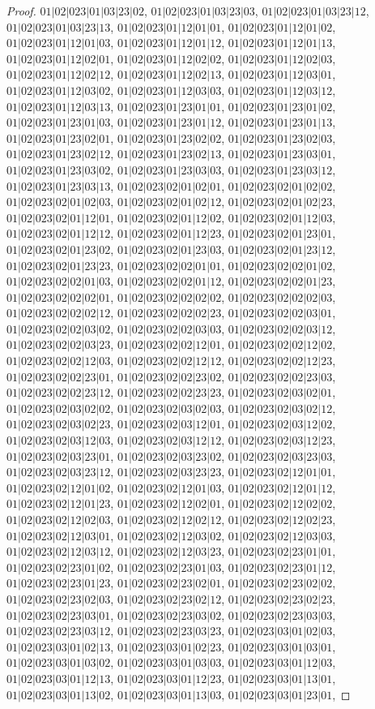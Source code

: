 \documentclass[12pt]{article}
\theoremstyle{plain}
\theoremstyle{definition}
\theoremstyle{remark}
\begin{document}
\begin{proof}
$01|02|023|01|03|23|02$, $01|02|023|01|03|23|03$, $01|02|023|01|03|23|12$, $01|02|023|01|03|23|13$, $01|02|023|01|12|01|01$, $01|02|023|01|12|01|02$, $01|02|023|01|12|01|03$, $01|02|023|01|12|01|12$, $01|02|023|01|12|01|13$, $01|02|023|01|12|02|01$, $01|02|023|01|12|02|02$, $01|02|023|01|12|02|03$, $01|02|023|01|12|02|12$, $01|02|023|01|12|02|13$, $01|02|023|01|12|03|01$, $01|02|023|01|12|03|02$, $01|02|023|01|12|03|03$, $01|02|023|01|12|03|12$, $01|02|023|01|12|03|13$, $01|02|023|01|23|01|01$, $01|02|023|01|23|01|02$, $01|02|023|01|23|01|03$, $01|02|023|01|23|01|12$, $01|02|023|01|23|01|13$, $01|02|023|01|23|02|01$, $01|02|023|01|23|02|02$, $01|02|023|01|23|02|03$, $01|02|023|01|23|02|12$, $01|02|023|01|23|02|13$, $01|02|023|01|23|03|01$, $01|02|023|01|23|03|02$, $01|02|023|01|23|03|03$, $01|02|023|01|23|03|12$, $01|02|023|01|23|03|13$, $01|02|023|02|01|02|01$, $01|02|023|02|01|02|02$, $01|02|023|02|01|02|03$, $01|02|023|02|01|02|12$, $01|02|023|02|01|02|23$, $01|02|023|02|01|12|01$, $01|02|023|02|01|12|02$, $01|02|023|02|01|12|03$, $01|02|023|02|01|12|12$, $01|02|023|02|01|12|23$, $01|02|023|02|01|23|01$, $01|02|023|02|01|23|02$, $01|02|023|02|01|23|03$, $01|02|023|02|01|23|12$, $01|02|023|02|01|23|23$, $01|02|023|02|02|01|01$, $01|02|023|02|02|01|02$, $01|02|023|02|02|01|03$, $01|02|023|02|02|01|12$, $01|02|023|02|02|01|23$, $01|02|023|02|02|02|01$, $01|02|023|02|02|02|02$, $01|02|023|02|02|02|03$, $01|02|023|02|02|02|12$, $01|02|023|02|02|02|23$, $01|02|023|02|02|03|01$, $01|02|023|02|02|03|02$, $01|02|023|02|02|03|03$, $01|02|023|02|02|03|12$, $01|02|023|02|02|03|23$, $01|02|023|02|02|12|01$, $01|02|023|02|02|12|02$, $01|02|023|02|02|12|03$, $01|02|023|02|02|12|12$, $01|02|023|02|02|12|23$, $01|02|023|02|02|23|01$, $01|02|023|02|02|23|02$, $01|02|023|02|02|23|03$, $01|02|023|02|02|23|12$, $01|02|023|02|02|23|23$, $01|02|023|02|03|02|01$, $01|02|023|02|03|02|02$, $01|02|023|02|03|02|03$, $01|02|023|02|03|02|12$, $01|02|023|02|03|02|23$, $01|02|023|02|03|12|01$, $01|02|023|02|03|12|02$, $01|02|023|02|03|12|03$, $01|02|023|02|03|12|12$, $01|02|023|02|03|12|23$, $01|02|023|02|03|23|01$, $01|02|023|02|03|23|02$, $01|02|023|02|03|23|03$, $01|02|023|02|03|23|12$, $01|02|023|02|03|23|23$, $01|02|023|02|12|01|01$, $01|02|023|02|12|01|02$, $01|02|023|02|12|01|03$, $01|02|023|02|12|01|12$, $01|02|023|02|12|01|23$, $01|02|023|02|12|02|01$, $01|02|023|02|12|02|02$, $01|02|023|02|12|02|03$, $01|02|023|02|12|02|12$, $01|02|023|02|12|02|23$, $01|02|023|02|12|03|01$, $01|02|023|02|12|03|02$, $01|02|023|02|12|03|03$, $01|02|023|02|12|03|12$, $01|02|023|02|12|03|23$, $01|02|023|02|23|01|01$, $01|02|023|02|23|01|02$, $01|02|023|02|23|01|03$, $01|02|023|02|23|01|12$, $01|02|023|02|23|01|23$, $01|02|023|02|23|02|01$, $01|02|023|02|23|02|02$, $01|02|023|02|23|02|03$, $01|02|023|02|23|02|12$, $01|02|023|02|23|02|23$, $01|02|023|02|23|03|01$, $01|02|023|02|23|03|02$, $01|02|023|02|23|03|03$, $01|02|023|02|23|03|12$, $01|02|023|02|23|03|23$, $01|02|023|03|01|02|03$, $01|02|023|03|01|02|13$, $01|02|023|03|01|02|23$, $01|02|023|03|01|03|01$, $01|02|023|03|01|03|02$, $01|02|023|03|01|03|03$, $01|02|023|03|01|12|03$, $01|02|023|03|01|12|13$, $01|02|023|03|01|12|23$, $01|02|023|03|01|13|01$, $01|02|023|03|01|13|02$, $01|02|023|03|01|13|03$, $01|02|023|03|01|23|01$, 
\end{proof}
\end{document}
